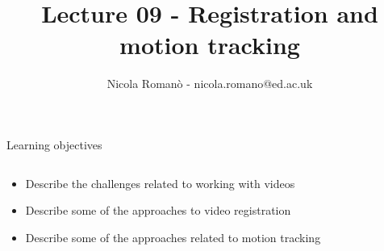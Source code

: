 \documentclass[9pt, aspectratio=169]{beamer}
\author{Nicola Roman\`o - nicola.romano@ed.ac.uk}
\title{Lecture 09 - Registration and motion tracking}
\date{}
\begin{document}

\begin{frame}
    \titlepage
\end{frame}

\begin{frame}
    {Learning objectives}
    \begin{columns}
        \begin{column}{0.8\textwidth}
            \begin{itemize}
                \item Describe the challenges related to working with videos
                \item Describe some of the approaches to video registration
                \item Describe some of the approaches related to motion tracking
            \end{itemize}
        \end{column}
        \begin{column}{0.2\textwidth}

\end{column}
\end{columns}
\end{frame}
\end{document}
